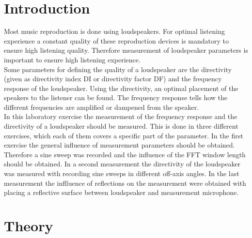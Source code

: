 \documentclass{article}
\begin{document}
\section{Introduction}
Most music reproduction is done using loudspeakers. For optimal listening experience a constant quality of these reproduction devices is mandatory to ensure high listening quality. Therefore measurement of loudspeaker parameters is important to ensure high listening experience.\\
Some parameters for defining the quality of a loudspeaker are the directivity (given as directivity index DI or directivity factor DF) and the frequency response of the loudspeaker. Using the directivity, an optimal placement of the speakers to the listener can be found. The frequency response tells how the different frequencies are amplified or dampened from the speaker.\\
In this laboratory exercise the measurement of the frequency response and the directivity of a loudspeaker should be measured. This is done in three different exercises, which each of them covers a specific part of the parameter. In the first exercise the general influence of measurement parameters should be obtained. Therefore a sine sweep was recorded and the influence of the FFT window length should be obtained. In a second measurement the directivity of the loudspeaker was measured with recording sine sweeps in different off-axis angles. In the last measurement the inflluence of reflections on the measurement were obtained with placing a reflective surface between loudspeaker and measurement microphone.
\section{Theory}
\end{document}
